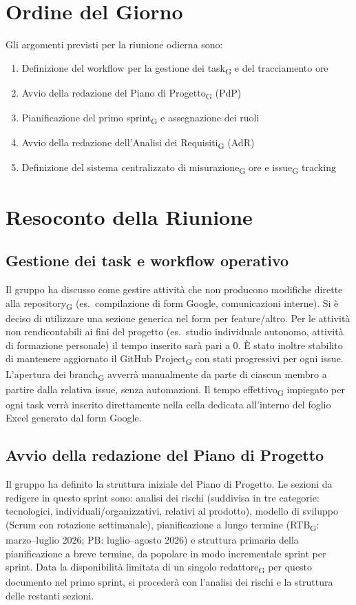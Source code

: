 \section{Ordine del Giorno}
Gli argomenti previsti per la riunione odierna sono:
\begin{enumerate}
	\item Definizione del workflow per la gestione dei task\textsubscript{G} e del tracciamento ore
	\item Avvio della redazione del Piano di Progetto\textsubscript{G} (PdP)
	\item Pianificazione del primo sprint\textsubscript{G} e assegnazione dei ruoli
	\item Avvio della redazione dell'Analisi dei Requisiti\textsubscript{G} (AdR)
	\item Definizione del sistema centralizzato di misurazione\textsubscript{G} ore e issue\textsubscript{G} tracking
\end{enumerate}

\section{Resoconto della Riunione}
\subsection{Gestione dei task e workflow operativo}
Il gruppo ha discusso come gestire attività che non producono modifiche dirette alla repository\textsubscript{G} (es.\ compilazione di form Google, comunicazioni interne). Si è deciso di utilizzare una sezione generica nel form per feature/altro. Per le attività non rendicontabili ai fini del progetto (es.\ studio individuale autonomo, attività di formazione personale) il tempo inserito sarà pari a 0. È stato inoltre stabilito di mantenere aggiornato il GitHub Project\textsubscript{G} con stati progressivi per ogni issue. L'apertura dei branch\textsubscript{G} avverrà manualmente da parte di ciascun membro a partire dalla relativa issue, senza automazioni. Il tempo effettivo\textsubscript{G} impiegato per ogni task verrà inserito direttamente nella cella dedicata all'interno del foglio Excel generato dal form Google.
 
\subsection{Avvio della redazione del Piano di Progetto}
Il gruppo ha definito la struttura iniziale del Piano di Progetto. Le sezioni da redigere in questo sprint sono: analisi dei rischi (suddivisa in tre categorie: tecnologici, individuali/organizzativi, relativi al prodotto), modello di sviluppo (Scrum con rotazione settimanale), pianificazione a lungo termine (RTB\textsubscript{G}: marzo–luglio 2026; PB: luglio–agosto 2026) e struttura primaria della pianificazione a breve termine, da popolare in modo incrementale sprint per sprint. Data la disponibilità limitata di un singolo redattore\textsubscript{G} per questo documento nel primo sprint, si procederà con l'analisi dei rischi e la struttura delle restanti sezioni.
 
